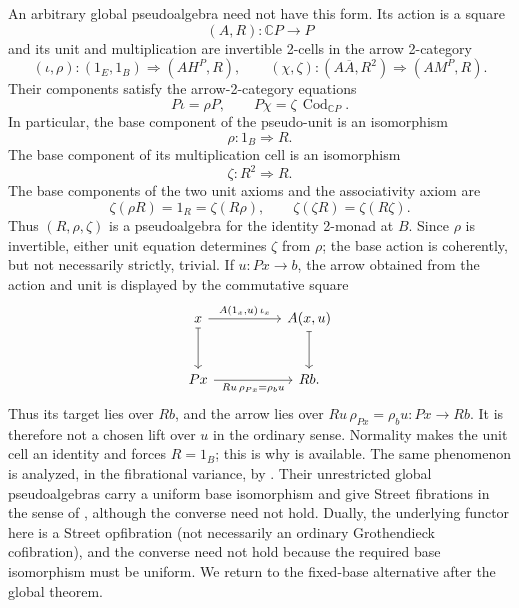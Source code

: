 \documentclass[11pt]{article}
\theoremstyle{plain}
\theoremstyle{definition}
\theoremstyle{remark}
\newcommand{\Cod}{\operatorname{Cod}}
\newcommand{\C}{\mathbb{C}}
\numberwithin{equation}{section}
\begin{document}
An arbitrary global pseudoalgebra need not have this form.  Its action
is a square
\begin{equation*}
  (A,R)\colon\C P\longrightarrow P
\end{equation*}
and its unit and multiplication are invertible 2-cells in the arrow
2-category
\begin{equation}
  (\iota,\rho)\colon(1_E,1_B)\Longrightarrow(AH^P,R),
  \qquad
  (\chi,\zeta)\colon(A\overline A,R^2)
    \Longrightarrow(AM^P,R).
  \label{eq:global-pseudoalgebra-cells}
\end{equation}
Their components satisfy the arrow-2-category equations
\begin{equation}
  P\iota=\rho P,
  \qquad
  P\chi=\zeta\,\Cod_{\C P}.
  \label{eq:global-pseudoalgebra-cell-conditions}
\end{equation}
In particular, the base component of the pseudo-unit is an isomorphism
\begin{equation}
  \rho\colon1_B\Longrightarrow R.
  \label{eq:base-twist}
\end{equation}
The base component of its multiplication cell is an isomorphism
\begin{equation*}
  \zeta\colon R^2\Longrightarrow R.
\end{equation*}
The base components of the two unit axioms and the associativity axiom
are
\begin{equation}
  \zeta(\rho R)=1_R=\zeta(R\rho),
  \qquad
  \zeta(\zeta R)=\zeta(R\zeta).
  \label{eq:global-base-coherence}
\end{equation}
Thus $(R,\rho,\zeta)$ is a pseudoalgebra for the identity 2-monad at
$B$.  Since $\rho$ is invertible, either unit equation determines
$\zeta$ from $\rho$; the base action is coherently, but not necessarily
strictly, trivial.
If $u\colon Px\to b$, the arrow obtained from the action and unit is
displayed by the commutative square
\begin{equation}
\begin{tikzcd}[column sep=huge,row sep=large]
x \arrow[r,"{A(1_x,u)\,\iota_x}"] \arrow[d,mapsto]
  & A(x,u) \arrow[d,mapsto] \\
Px \arrow[r,"{Ru\,\rho_{Px}=\rho_bu}"']
  & Rb .
\end{tikzcd}
\label{eq:global-base-twisted-lift}
\end{equation}
Thus its target lies over $Rb$, and the arrow lies over
$Ru\,\rho_{Px}=\rho_bu\colon Px\to Rb$.
It is therefore not a chosen lift over $u$ in the ordinary sense.
Normality makes the unit cell an identity and forces $R=1_B$; this is
why  is available.  The same phenomenon is
analyzed, in the fibrational variance, by
\citet[Remark~2.7(b)]{EmmeneggerEtAl2024}.  Their unrestricted global
pseudoalgebras carry a uniform base isomorphism and give Street
fibrations in the sense of \citet{Street1974}, although the converse
need not hold.  Dually, the
underlying functor here is a Street opfibration (not necessarily an
ordinary Grothendieck cofibration), and the converse need not hold
because the required base isomorphism must be uniform.  We return to
the fixed-base alternative after the global theorem.
\end{document}
